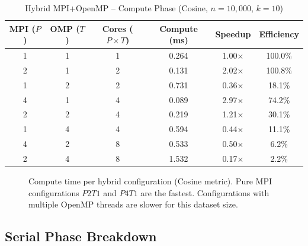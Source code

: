 \documentclass[12pt,a4paper]{article}
\begin{document}
\begin{table}[!htbp]
\centering
\small
\caption{Hybrid MPI+OpenMP -- Compute Phase (Cosine, $n=10{,}000$, $k=10$)}
\label{tab:hybrid}
\renewcommand{\arraystretch}{1.3}
\begin{tabular}{|c|c|c|c|c|c|}
\hline
\textbf{MPI ($P$)} & \textbf{OMP ($T$)} &
\textbf{Cores ($P\times T$)} &
\textbf{Compute (ms)} &
\textbf{Speedup} & \textbf{Efficiency} \\
\hline
1 & 1 & 1 & 0.264 & 1.00$\times$ & 100.0\% \\
2 & 1 & 2 & 0.131 & 2.02$\times$ & 100.8\% \\
1 & 2 & 2 & 0.731 & 0.36$\times$ &  18.1\% \\
4 & 1 & 4 & 0.089 & 2.97$\times$ &  74.2\% \\
2 & 2 & 4 & 0.219 & 1.21$\times$ &  30.1\% \\
1 & 4 & 4 & 0.594 & 0.44$\times$ &  11.1\% \\
4 & 2 & 8 & 0.533 & 0.50$\times$ &   6.2\% \\
2 & 4 & 8 & 1.532 & 0.17$\times$ &   2.2\% \\
\hline
\end{tabular}
\end{table}

\begin{figure}[!htbp]
\centering
{}
\caption{Compute time per hybrid configuration (Cosine metric). Pure
         MPI configurations $P2T1$ and $P4T1$ are the fastest.
         Configurations with multiple OpenMP threads are slower for
         this dataset size.}
\label{fig:hybrid}
\end{figure}
\clearpage
\subsection{Serial Phase Breakdown}
\end{document}
